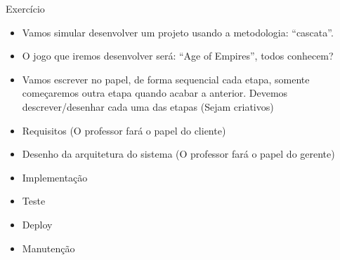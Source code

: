 \begin{frame}
\begin{block}{Exercício}
	 \begin{itemize}
			\item Vamos simular desenvolver um projeto usando a metodologia: ``cascata''.

			\item O jogo que iremos desenvolver será: ``Age of Empires'', todos conhecem?
			
			\item Vamos escrever no papel, de forma sequencial cada etapa, somente começaremos outra etapa quando acabar a anterior. Devemos descrever/desenhar cada uma das etapas (Sejam criativos) 
			
			\item Requisitos (O professor fará o papel do cliente)
			
			\item Desenho da arquitetura do sistema (O professor fará o papel do gerente)
			
			\item Implementação
			
			\item Teste

			\item Deploy
			
			\item Manutenção

	 \end{itemize}
\end{block}
\end{frame}

